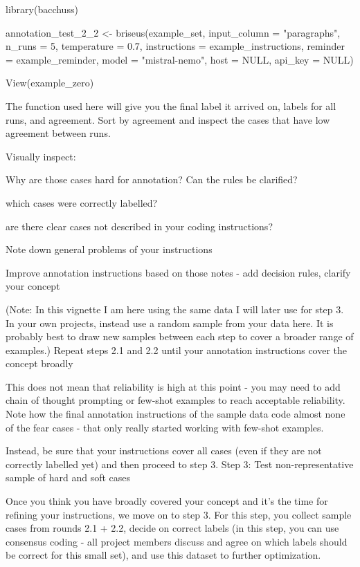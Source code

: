 \documentclass[11pt,titlepage,oneside,openany]{article}
\begin{document}
\begin{itemize}
library(bacchuss)

annotation_test_2_2 <- briseus(example_set, input_column = "paragraphs", n_runs = 5,
                        temperature = 0.7,
                        instructions = example_instructions,
                        reminder = example_reminder,
                        model = "mistral-nemo",
                        host = NULL,
                        api_key = NULL)

View(example_zero)

The function used here will give you the final label it arrived on, labels for all runs, and agreement. Sort by agreement and inspect the cases that have low agreement between runs.

Visually inspect:

    Why are those cases hard for annotation? Can the rules be clarified?

    which cases were correctly labelled?

    are there clear cases not described in your coding instructions?

    Note down general problems of your instructions

    Improve annotation instructions based on those notes - add decision rules, clarify your concept

(Note: In this vignette I am here using the same data I will later use for step 3. In your own projects, instead use a random sample from your data here. It is probably best to draw new samples between each step to cover a broader range of examples.)
Repeat steps 2.1 and 2.2 until your annotation instructions cover the concept broadly

This does not mean that reliability is high at this point - you may need to add chain of thought prompting or few-shot examples to reach acceptable reliability. Note how the final annotation instructions of the sample data code almost none of the fear cases - that only really started working with few-shot examples.

Instead, be sure that your instructions cover all cases (even if they are not correctly labelled yet) and then proceed to step 3.
Step 3: Test non-representative sample of hard and soft cases

Once you think you have broadly covered your concept and it’s the time for refining your instructions, we move on to step 3. For this step, you collect sample cases from rounds 2.1 + 2.2, decide on correct labels (in this step, you can use consensus coding - all project members discuss and agree on which labels should be correct for this small set), and use this dataset to further optimization.


\end{itemize}
\end{document}
